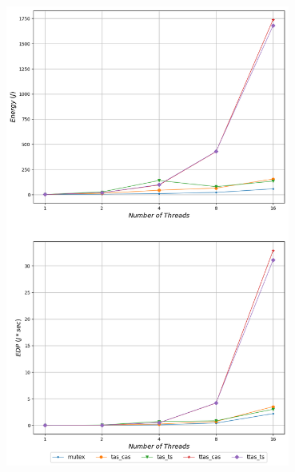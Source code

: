 \begin{minipage}{\textwidth}
   \begin{center}
      \\
      \vspace{3mm}
      \includegraphics[width=0.7\textwidth]{./graphs/energy/grain-100.png}
      \vspace{6mm}
   \end{center}
\end{minipage}